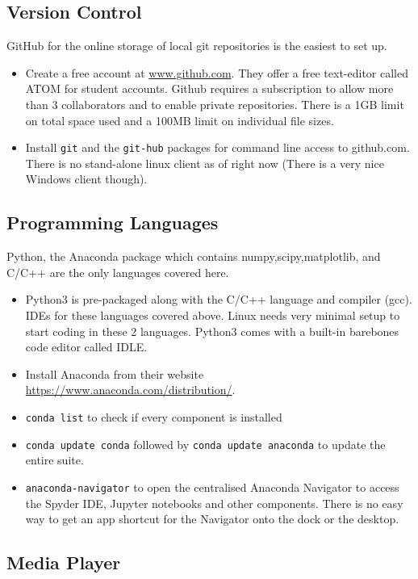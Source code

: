 \documentclass[10pt,letterpaper,twocolumn]{article}
\begin{document}
\subsection{Version Control}

GitHub for the online storage of local git repositories is the easiest to set up.

\begin{itemize}
	\item Create a free account at \url{www.github.com}. They offer a free text-editor called ATOM for student accounts. Github requires a subscription to allow more than 3 collaborators and to enable private repositories. There is a 1GB limit on total space used and a 100MB limit on individual file sizes.
	\item Install \texttt{git} and the \texttt{git-hub} packages for command line access to github.com. There is no stand-alone linux client as of right now (There is a very nice Windows client though).
\end{itemize}

\subsection{Programming Languages}
Python, the Anaconda package which contains numpy,scipy,matplotlib, and C/C++ are the only languages covered here.

\begin{itemize}
	\item Python3 is pre-packaged along with the C/C++ language and compiler (gcc). IDEs for these languages covered above. Linux needs very minimal setup to start coding in these 2 languages. Python3 comes with a built-in barebones code editor called IDLE. 
	\item Install Anaconda from their website \\ \url{https://www.anaconda.com/distribution/}. 
	\item \texttt{conda list} to check if every component is installed
	\item \texttt{conda update conda} followed by \texttt{conda update anaconda} to update the entire suite.
	\item \texttt{anaconda-navigator} to open the centralised Anaconda Navigator to access the Spyder IDE, Jupyter notebooks and other components. There is no easy way to get an app shortcut for the Navigator onto the dock or the desktop.
\end{itemize}

\subsection{Media Player}
\end{document}

